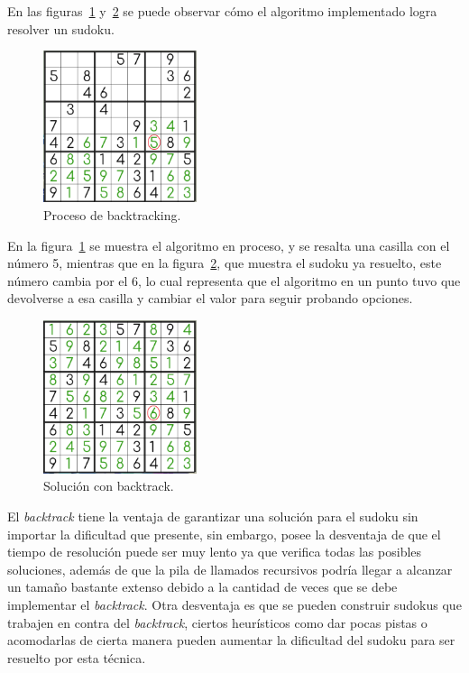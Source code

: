 \documentclass[conference]{IEEEtran}
\begin{document}
En las figuras~\ref{fig:backtrack1} y~\ref{fig:backtrack2} se puede observar cómo el algoritmo implementado logra resolver un sudoku.

\begin{otherlanguage}{spanish}
\begin{figure}[H]
\centering
\includegraphics[width=0.4\textwidth]{backtrack1.png}
\caption{\label{fig:backtrack1}Proceso de backtracking.}
\end{figure}
\end{otherlanguage}

En la figura~\ref{fig:backtrack1} se muestra el algoritmo en proceso, y se resalta una casilla con el número 5, mientras que en la figura~\ref{fig:backtrack2}, que muestra el sudoku ya resuelto, este número cambia por el 6, lo cual representa que el algoritmo en un punto tuvo que devolverse a esa casilla y cambiar el valor para seguir probando opciones.

\begin{otherlanguage}{spanish}
\begin{figure}[H]
\centering
\includegraphics[width=0.4\textwidth]{backtrack2.png}
\caption{\label{fig:backtrack2}Solución con backtrack.}
\end{figure}
\end{otherlanguage}

El \textit{backtrack} tiene la ventaja de garantizar una solución para el sudoku sin importar la dificultad que presente, sin embargo, posee la desventaja de que el tiempo de resolución puede ser muy lento ya que verifica todas las posibles soluciones, además de que la pila de llamados recursivos podría llegar a alcanzar un tamaño bastante extenso debido a la cantidad de veces que se debe implementar el \textit{backtrack}. Otra desventaja es que se pueden construir sudokus que trabajen en contra del \textit{backtrack}, ciertos heurísticos como dar pocas pistas o acomodarlas de cierta manera pueden aumentar la dificultad del sudoku para ser resuelto por esta técnica.
\end{document}
